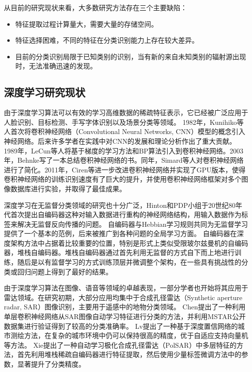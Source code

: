从目前的研究现状来看，大多数研究方法存在三个主要缺陷：
\begin{itemize}
\item 特征提取过程计算量大，需要大量的存储空间。
\item 特征选择困难，不同的特征在分类识别能力上存在较大差异。
\item 目前的分类识别局限于已知类别的识别，当有新的来自未知类别的辐射源出现时，无法准确迅速的发现。
\end{itemize}

\subsection{深度学习研究现状}
由于深度学习算法可以有效的学习高维数据的稀疏特征表示，它已经被广泛应用于人脸识别、目标检测、手写字体识别以及场景分类等领域。
1982年，Kunihiko等人首次将卷积神经网络（Convolutional Neural Networks, CNN）模型的概念引入神经网络。后来许多学者在实践中对CNN的发展和理论分析作出了重大贡献。1989年，LeCun等人将基于梯度的学习方法和BP算法引入到卷积神经网络。2003年，Behnke写了一本总结卷积神经网络的书。同年，Simard等人对卷积神经网络进行了简化。2011年，Ciren等进一步改进卷积神经网络并实现了GPU版本，使得卷积神经网络的训练识别速度有了巨大的提升，并使用卷积神经网络框架对多个图像数据库进行实验，并取得了最佳成果。

深度学习在无监督分类领域的研究也十分广泛，Hinton和PDP小组于20世纪80年代首次提出自编码器这种对输入数据进行重构的神经网络结构，用输入数据作为标签来解决无监督反向传播的问题。
自编码器与Hebbian学习规则共同为无监督学习提供了一个基本的范例，后来被推广到各种问题的全局学习方面。
自编码器在深度架构方法中占据着比较重要的位置，特别是形式上类似受限玻尔兹曼机的自编码器，堆栈自编码器。堆栈自编码器通过首先利用无监督的方式自下而上地进行训练，随后是以有监督学习的方式训练顶层并微调整个架构，在一些具有挑战性的分类或回归问题上得到了最好的结果。

由于深度学习算法在图像、语音等领域的卓越表现，一部分学者也开始将其应用于雷达领域。在研究初期，大部分应用均集中于合成孔径雷达（Synthetic aperture radar, SAR）图像识别，主要用于遥感中的地物分类领域。
Chen提出了一种利用单层卷积神经网络从SAR图像自动学习特征进行分类的方法，并利用MSTAR公开数据集进行验证得到了较高的分类准确率。
Lv提出了一种基于深度置信网络的城市测绘方法，在复杂的城市环境中仍可以保持很高的精度，优于自适应支持向量机等方法。
Xie提出了一种自动学习极化合成孔径雷达（PolSAR）中多层特征的方法，首先利用堆栈稀疏自编码器进行特征提取，然后使用少量标签微调方法中的参数，显著提升了分类精度。

